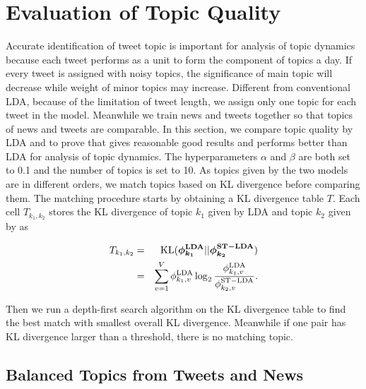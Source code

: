 \section{Evaluation of Topic Quality}
\label{sec:eva}

Accurate identification of tweet topic is important for analysis of topic dynamics because each tweet performs as a unit to form the component of topics a day. If every tweet is assigned with noisy topics, the significance of main topic will decrease while weight of minor topics may increase. Different from conventional LDA, because of the limitation of tweet length, we assign only one topic for each tweet in the \stlda model. Meanwhile we train news and tweets together so that topics of news and tweets are comparable. In this section, we compare topic quality by LDA and \stlda to prove that \stlda gives reasonable good results and performs better than LDA for analysis of topic dynamics. The hyperparameters $\alpha$ and $\beta$ are both set to 0.1 and the number of topics is set to 10. As topics given by the two models are in different orders, we match topics based on KL divergence before comparing them. The matching procedure starts by obtaining a KL divergence table $T$. Each cell $T_{k_1,k_2}$ stores the KL divergence of topic $k_1$ given by LDA and topic $k_2$ given by \stlda as

\begin{eqnarray}
T_{k_1,k_2}&=&\mathrm{KL}(\bm{\phi_{k_1}^\mathrm{LDA}}||\bm{\phi_{k_2}^\mathrm{ST-LDA}})\\
&=&\sum_{v=1}^{V} \phi_{k_1,v}^{\mathrm{LDA}} \log_2 \frac{\phi_{k_1,v}^{\mathrm{LDA}}}{\phi_{k_2,v}^{\mathrm{ST-LDA}}}.
\end{eqnarray}

Then we run a depth-first search algorithm on the KL divergence table to find the best match with smallest overall KL divergence. Meanwhile if one pair has KL divergence larger than a threshold, there is no matching topic.

\subsection{Balanced Topics from Tweets and News}

